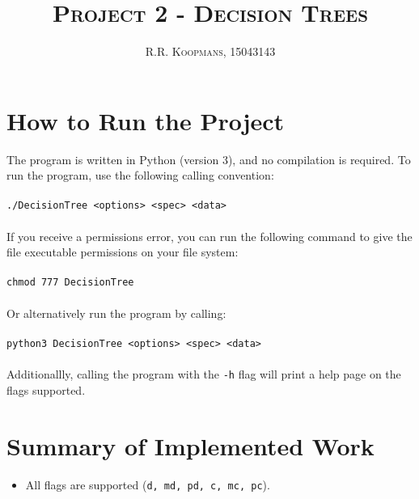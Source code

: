 \documentclass[10pt,a4paper]{article}
\author{\textsc{R.R. Koopmans, 15043143}}
\title{\textsc{Project 2 - Decision Trees}}
\begin{document}
\maketitle
	\section{How to Run the Project}

	The program is written in Python (version 3), and no compilation is required. To run the program, use the following calling convention:
	\\\\
	\texttt{./DecisionTree <options> <spec> <data>}
	\\\\
	If you receive a permissions error, you can run the following command to give the file executable permissions on your file system:
	\\\\
	\texttt{chmod 777 DecisionTree}
	\\\\
	Or alternatively run the program by calling:
	\\\\
	\texttt{python3 DecisionTree <options> <spec> <data>}
	\\\\
	Additionallly, calling the program with the \texttt{-h} flag will print a help page on the flags supported.

	\section{Summary of Implemented Work}

		\begin{itemize}
			\item All flags are supported (\texttt{d, md, pd, c, mc, pc}).
		\end{itemize}
\end{document}
